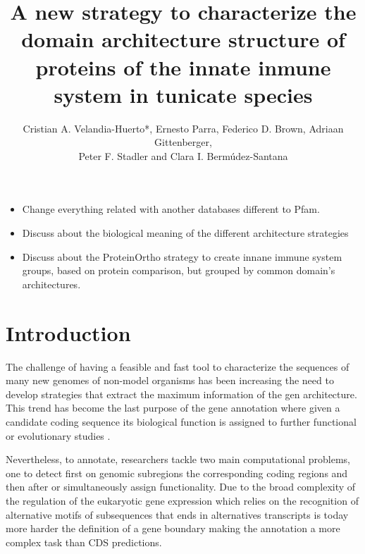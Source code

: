 \documentclass[11pt]{article}
\newcommand{\TODO}[1]{\begingroup\color{red}#1\endgroup}
\begin{document}
\title{A new strategy to characterize the domain architecture structure of 
proteins of the innate inmune system in tunicate species}
\author{Cristian A. Velandia-Huerto*, Ernesto Parra, Federico D. 
Brown, Adriaan Gittenberger, \\ Peter F. Stadler and Clara I. 
Berm\'{u}dez-Santana}


\maketitle

\begin{itemize}
\item \TODO{Change everything related with another databases different to Pfam}. 
\item \TODO{Discuss about the biological meaning of the different architecture 
strategies}
\item \TODO{Discuss about the ProteinOrtho strategy to create innane immune 
system groups, based on protein comparison, but grouped by common domain's 
architectures}.
\end{itemize}


\section{Introduction}

The challenge of having a feasible and fast tool to characterize the sequences 
of many new genomes of non-model organisms has been increasing the need to 
develop strategies that extract the maximum information of the gen architecture. 
This trend has become the last purpose of the gene annotation where given a 
candidate coding sequence its biological function is assigned to further 
functional or evolutionary studies \cite{aken2016ensembl} 
\cite{birney2004overview} \cite{ashburner2000gene} \cite{tatusov2000cog} 
\cite{tatusova2016ncbi}. 

Nevertheless, to annotate, researchers tackle two main computational problems, 
one to detect first on genomic subregions the corresponding coding regions and 
then after or simultaneously assign functionality. Due to the broad complexity 
of the regulation of the eukaryotic gene expression which relies on 
the recognition of alternative motifs of subsequences that ends in alternatives 
transcripts is today more harder the definition of a gene boundary making the 
annotation a more complex task than CDS predictions\cite{yandell2012}. 
\end{document}
